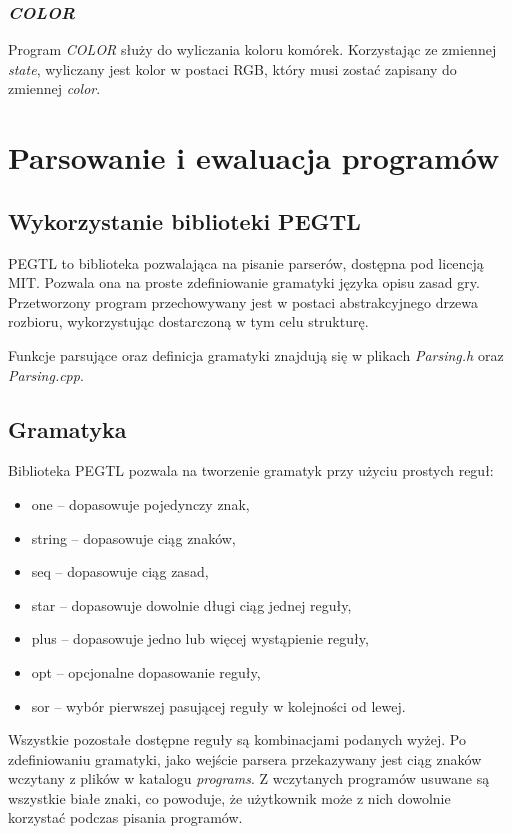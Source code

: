 \documentclass[declaration,shortabstract, inz]{iithesis}
\theoremstyle{definition} \newtheorem{definition}{Definicja}[]
\theoremstyle{plain} \newtheorem{remark}[definition]{Obserwacja}
\theoremstyle{plain} \newtheorem{theorem}[definition]{Twierdzenie}
\theoremstyle{plain} \newtheorem{example}{Przykład}[definition]
\theoremstyle{plain} \newtheorem{lemma}[definition]{Lemat}
\begin{document}
\subsection{\textit{COLOR}}
Program \textit{COLOR} służy do wyliczania koloru komórek. Korzystając ze zmiennej \textit{state}, wyliczany jest kolor w postaci RGB, który musi zostać zapisany do zmiennej \textit{color}. 

\chapter{Parsowanie i ewaluacja programów}

\section{Wykorzystanie biblioteki PEGTL}
PEGTL to biblioteka pozwalająca na pisanie parserów, dostępna pod licencją MIT. Pozwala ona na proste zdefiniowanie gramatyki języka opisu zasad gry. Przetworzony program przechowywany jest w postaci abstrakcyjnego drzewa rozbioru, wykorzystując dostarczoną w tym celu strukturę. 

Funkcje parsujące oraz definicja gramatyki znajdują się w plikach \textit{Parsing.h} oraz \textit{Parsing.cpp}. 

\section{Gramatyka}

Biblioteka PEGTL pozwala na tworzenie gramatyk przy użyciu prostych reguł:
\begin{itemize}
\item one -- dopasowuje pojedynczy znak,
\item string -- dopasowuje ciąg znaków,
\item seq  -- dopasowuje ciąg zasad,
\item star -- dopasowuje dowolnie długi ciąg jednej reguły,
\item plus -- dopasowuje jedno lub więcej wystąpienie reguły,
\item opt  -- opcjonalne dopasowanie reguły,
\item sor -- wybór pierwszej pasującej reguły w kolejności od lewej.
\end{itemize}

Wszystkie pozostałe dostępne reguły są kombinacjami podanych wyżej. Po zdefiniowaniu gramatyki, jako wejście parsera przekazywany jest ciąg znaków wczytany z plików w katalogu \textit{programs}. Z wczytanych programów usuwane są wszystkie białe znaki, co powoduje, że użytkownik może z nich dowolnie korzystać podczas pisania programów.
\end{document}
